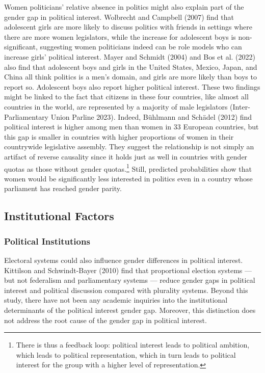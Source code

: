 \documentclass[
  letterpaper,
  DIV=11,
  numbers=noendperiod]{scrreprt}
\begin{document}
Women politicians' relative absence in politics might also explain part
of the gender gap in political interest. Wolbrecht and Campbell (2007)
find that adolescent girls are more likely to discuss politics with
friends in settings where there are more women legislators, while the
increase for adolescent boys is non-significant, suggesting women
politicians indeed can be role models who can increase girls' political
interest. Mayer and Schmidt (2004) and Bos et al. (2022) also find that
adolescent boys and girls in the United States, Mexico, Japan, and China
all think politics is a men's domain, and girls are more likely than
boys to report so. Adolescent boys also report higher political
interest. These two findings might be linked to the fact that citizens
in these four countries, like almost all countries in the world, are
represented by a majority of male legislators (Inter-Parliamentary Union
Parline 2023). Indeed, Bühlmann and Schädel (2012) find political
interest is higher among men than women in 33 European countries, but
this gap is smaller in countries with higher proportions of women in
their countrywide legislative assembly. They suggest the relationship is
not simply an artifact of reverse causality since it holds just as well
in countries with gender quotas as those without gender
quotas.\footnote{There is thus a feedback loop: political interest leads
  to political ambition, which leads to political representation, which
  in turn leads to political interest for the group with a higher level
  of representation.} Still, predicted probabilities show that women
would be significantly less interested in politics even in a country
whose parliament has reached gender parity.

\subsection{Institutional Factors}\label{institutional-factors}

\subsubsection{Political Institutions}\label{political-institutions}

Electoral systems could also influence gender differences in political
interest. Kittilson and Schwindt-Bayer (2010) find that proportional
election systems --- but not federalism and parliamentary systems ---
reduce gender gaps in political interest and political discussion
compared with plurality systems. Beyond this study, there have not been
any academic inquiries into the institutional determinants of the
political interest gender gap. Moreover, this distinction does not
address the root cause of the gender gap in political interest.
\end{document}

